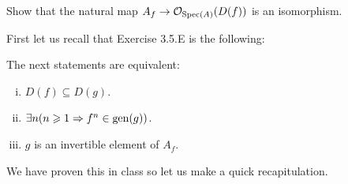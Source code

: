 \documentclass[12pt]{memoir}
\begin{document}

    \begin{Ej}[4.1.A Vakil]
        Show that the natural map $A_f\to\mathcal{O}_{\operatorname{Spec}(A)}(D(f))$ is an isomorphism. 
    \end{Ej}

    First let us recall that Exercise 3.5.E is the following:

    \begin{Lem}
        The next statements are equivalent:
        \begin{enumerate}[i)]
            \itemsep=-0.4em
            \item $D(f)\subseteq D(g)$.
            \item $\exists n(n\geqslant 1\Rightarrow f^n\in\operatorname{gen}(g))$.
            \item $g$ is an invertible element of $A_f$.
        \end{enumerate}
    \end{Lem}

    We have proven this in class so let us make a quick recapitulation.
\end{document}
